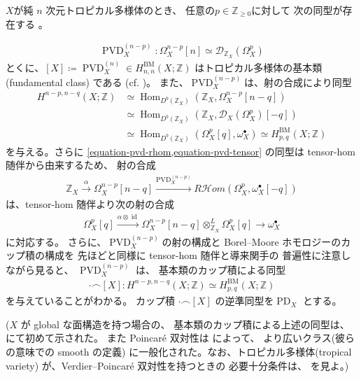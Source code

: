 \documentclass[a4paper,dvipdfmx,reqno,12pt]{amsart}
\theoremstyle{definition}
\newcommand{\deq}{\coloneqq}
\newcommand{\opn}[1]{\operatorname{#1}}
\newcommand{\xto}[1]{\xrightarrow{#1}}
\numberwithin{equation}{section}
\begin{document}
$X$が純 $n$ 次元トロピカル多様体のとき、
任意の$p\in\mathbb{Z}_{\geq 0}$に対して
次の同型が存在する
\cite[Theorem 6.2]{gross2019sheaftheoretic}。

\begin{align}
\opn{PVD}^{(n-p)}_X\colon \Omega_{X}^{n-p}[n]\simeq
\mathcal{D}_{\mathbb{Z}_X}(\Omega_X^{p})
\end{align}
とくに、$[X]\deq \opn{PVD}^{(n)}_X\in H_{n,n}^{\mathrm{BM}}
(X;\mathbb{Z})$
はトロピカル多様体の基本類(fundamental class)
である (cf. \cite[Definition 4.8]{MR3894860})。
また、$\opn{PVD}^{(n-p)}_X$は、射の合成により同型
\begin{align}
H^{n-p,n-q}(X;\mathbb{Z})& \simeq
\opn{Hom}_{D^{b}(\mathbb{Z}_X)}
(\mathbb{Z}_X,\Omega_X^{n-p}[n-q]) \\
& \simeq \opn{Hom}_{D^{b}(\mathbb{Z}_X)}
(\mathbb{Z}_X,\mathcal{D}_X(\Omega_X^{p})[-q])
\label{equation-pvd-rhom} \\
& \simeq \opn{Hom}_{D^{b}(\mathbb{Z}_X)}
(\Omega_X^{p}[q],\omega_X^{\bullet})
\simeq H_{p,q}^{\mathrm{BM}}(X;\mathbb{Z})
\label{equation-pvd-tensor}
\end{align}
を与える。さらに
\cref{equation-pvd-rhom,equation-pvd-tensor}
の同型は tensor-hom 随伴から由来するため、
射の合成
\begin{align}
\mathbb{Z}_X \xto{\alpha} \Omega_X^{n-p}[n-q] 
\xto{\opn{PVD}^{(n-p)}_X} 
R\mathcal{H}om (\Omega_X^{p},\omega_X^{\bullet}[-q])
\end{align}
は、tensor-hom 随伴より次の射の合成
\begin{align}
\Omega_X^{p}[q]\xto{\alpha \otimes \opn{id}} \Omega_X^{n-p}[n-q]\otimes^{L}_{\mathbb{Z}_X}
\Omega_X^{p}[q] \to\omega_X^{\bullet}
\end{align}
に対応する。
さらに、$\opn{PVD}^{(n-p)}_X$の射の構成と
Borel--Moore ホモロジーのカップ積の構成を
先ほどと同様に tensor-hom 随伴と導来関手の
普遍性に注意しながら見ると、
$\opn{PVD}^{(n-p)}_X$ は、
基本類のカップ積による同型
\begin{align}
\label{equation-cup-pd}
\cdot \frown [X]
\colon H^{n-p,n-q}(X;\mathbb{Z})\simeq
H^{\mathrm{BM}}_{p,q}(X;\mathbb{Z})
\end{align}
を与えていることがわかる。
カップ積 $\cdot \frown [X]$
の逆準同型を$\opn{PD}_X$ とする。

($X$ が global な面構造を持つ場合の、
基本類のカップ積による上述の同型は、
\cite[Theorem 5.3]{MR3894860} にて初めて示された。
また Poincar\'e 双対性は
\cite[Theorem 1.2]{amini2021homology}によって、
より広いクラス(彼らの意味での smooth の定義)
に一般化された。なお、トロピカル多様体(tropical variety)
が、Verdier--Poincar\'e 双対性を持つときの
必要十分条件は、\cite[Theorem 6.7]{MR4637248}
を見よ。)
\end{document}
